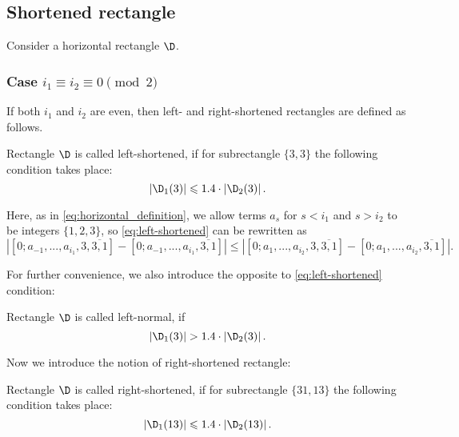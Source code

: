 \subsection{Shortened rectangle}
\label{sbsc:shortened}

Consider a horizontal rectangle $\D$.


\subsubsection{Case $i_1 \equiv i_2 \equiv 0 \pmod 2$}
\label{sbsbsc:shortened_even}

If both $i_1$ and $i_2$ are even, then left- and right-shortened rectangles are defined as follows.

\begin{definition}
	Rectangle $\D$ is called left-shortened,
	if for subrectangle $\{3, 3\}$ the following condition takes place:
	\begin{equation}
		\label{eq:left-shortened}
		\left| \D_1(3) \right| \leqslant 1.4 \cdot \left| \D_2(3) \right|.
	\end{equation}
\end{definition}

Here, as in \ref{eq:horizontal_definition},
we allow terms $a_s$ for $s < i_1$ and $s > i_2$ to be integers $\{1, 2, 3\}$,
so \ref{eq:left-shortened} can be rewritten as
%
\begin{equation*}
	\left|
		\left[ 0; a_{-1}, ..., a_{i_1}, 3, \overline{3, 1} \right] -
		\left[ 0; a_{-1}, ..., a_{i_1}, \overline{3, 1} \right]
	\right| \leqslant \left|
		\left[ 0; a_{1}, ..., a_{i_2}, 3, \overline{3, 1} \right] -
		\left[ 0; a_{1}, ..., a_{i_2}, \overline{3, 1} \right]
	\right|.
\end{equation*}

For further convenience, we also introduce the opposite to \ref{eq:left-shortened} condition:

\begin{definition}
	Rectangle $\D$ is called left-normal, if
	\begin{equation}
		\label{eq:left-normal}
		\left| \D_1(3) \right| > 1.4 \cdot \left| \D_2(3) \right|.
	\end{equation}
\end{definition}

Now we introduce the notion of right-shortened rectangle:

\begin{definition}
	Rectangle $\D$ is called right-shortened,
	if for subrectangle $\{31, 13\}$ the following condition takes place:
	\begin{equation}
		\label{eq:right-shortened}
		\left| \D_1(13) \right| \leqslant 1.4 \cdot \left| \D_2(13) \right|.
	\end{equation}
\end{definition}

